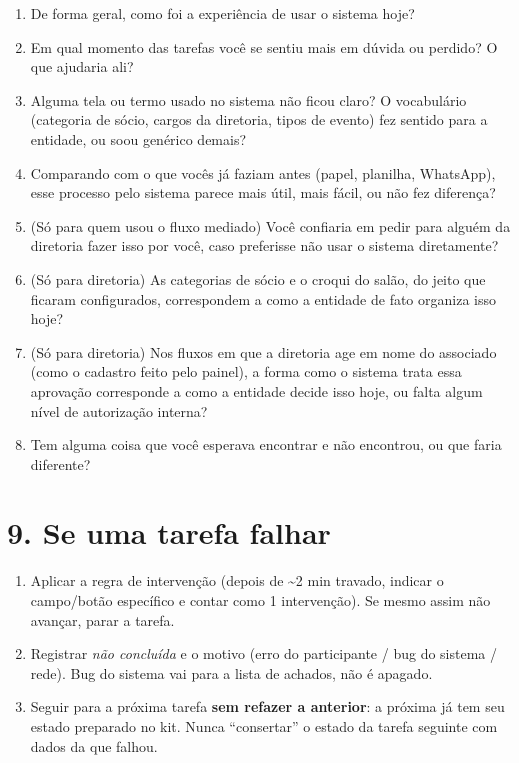 \documentclass[11pt,a4paper]{article}
\begin{document}
\begin{enumerate}[leftmargin=6mm]
  \item De forma geral, como foi a experiência de usar o sistema hoje?
  \item Em qual momento das tarefas você se sentiu mais em dúvida ou perdido? O que ajudaria ali?
  \item Alguma tela ou termo usado no sistema não ficou claro? O vocabulário (categoria de sócio,
    cargos da diretoria, tipos de evento) fez sentido para a entidade, ou soou genérico demais?
  \item Comparando com o que vocês já faziam antes (papel, planilha, WhatsApp), esse processo pelo
    sistema parece mais útil, mais fácil, ou não fez diferença?
  \item (Só para quem usou o fluxo mediado) Você confiaria em pedir para alguém da diretoria fazer
    isso por você, caso preferisse não usar o sistema diretamente?
  \item (Só para diretoria) As categorias de sócio e o croqui do salão, do jeito que ficaram
    configurados, correspondem a como a entidade de fato organiza isso hoje?
  \item (Só para diretoria) Nos fluxos em que a diretoria age em nome do associado (como o
    cadastro feito pelo painel), a forma como o sistema trata essa aprovação corresponde a como a
    entidade decide isso hoje, ou falta algum nível de autorização interna?
  \item Tem alguma coisa que você esperava encontrar e não encontrou, ou que faria diferente?
\end{enumerate}

\section*{9. Se uma tarefa falhar}

\begin{enumerate}[leftmargin=6mm]
  \item Aplicar a regra de intervenção (depois de \textasciitilde2 min travado, indicar o
    campo/botão específico e contar como 1 intervenção). Se mesmo assim não avançar, parar a
    tarefa.
  \item Registrar \textit{não concluída} e o motivo (erro do participante / bug do sistema /
    rede). Bug do sistema vai para a lista de achados, não é apagado.
  \item Seguir para a próxima tarefa \textbf{sem refazer a anterior}: a próxima já tem seu estado
    preparado no kit. Nunca ``consertar'' o estado da tarefa seguinte com dados da que falhou.
\end{enumerate}
\end{document}
